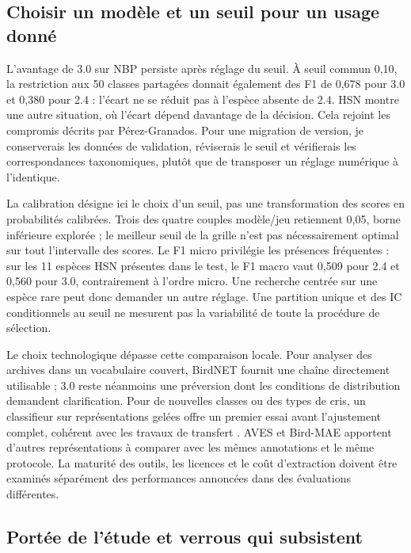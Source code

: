 \documentclass{technology_watch}
\begin{document}
\subsection{Choisir un modèle et un seuil pour un usage donné}

L'avantage de 3.0 sur NBP persiste après réglage du seuil. À seuil commun 0,10,
la restriction aux 50 classes partagées donnait également des F1 de 0,678
pour 3.0 et 0,380 pour 2.4 : l'écart ne se réduit pas à l'espèce absente de 2.4.
HSN montre une autre situation, où l'écart dépend davantage de la décision.
Cela rejoint les compromis décrits par Pérez-Granados\cite{perez2023}.
Pour une migration de version, je conserverais les données de validation,
réviserais le seuil et vérifierais les correspondances taxonomiques, plutôt
que de transposer un réglage numérique à l'identique.

La calibration désigne ici le choix d'un seuil, pas une transformation des
scores en probabilités calibrées. Trois des quatre couples modèle/jeu
retiennent 0,05, borne inférieure explorée ; le meilleur seuil de la grille
n'est pas nécessairement optimal sur tout l'intervalle des scores. Le F1 micro
privilégie les présences fréquentes : sur les 11 espèces HSN présentes dans le
test, le F1 macro vaut 0,509 pour 2.4 et 0,560 pour 3.0, contrairement à
l'ordre micro. Une recherche centrée sur une espèce rare peut donc demander
un autre réglage. Une partition unique et des IC conditionnels au seuil ne
mesurent pas la variabilité de toute la procédure de sélection.

Le choix technologique dépasse cette comparaison locale. Pour analyser des
archives dans un vocabulaire couvert, BirdNET fournit une chaîne directement
utilisable ; 3.0 reste néanmoins une préversion dont les conditions de
distribution demandent clarification. Pour de nouvelles classes ou des types
de cris, un classifieur sur représentations gelées offre un premier essai
avant l'ajustement complet, cohérent avec les travaux de transfert
\cite{ghani2023,ghani2025}. AVES et Bird-MAE apportent d'autres représentations
à comparer avec les mêmes annotations et le même protocole. La maturité des
outils, les licences et le coût d'extraction doivent être examinés séparément
des performances annoncées dans des évaluations différentes.

\subsection{Portée de l'étude et verrous qui subsistent}
\end{document}
